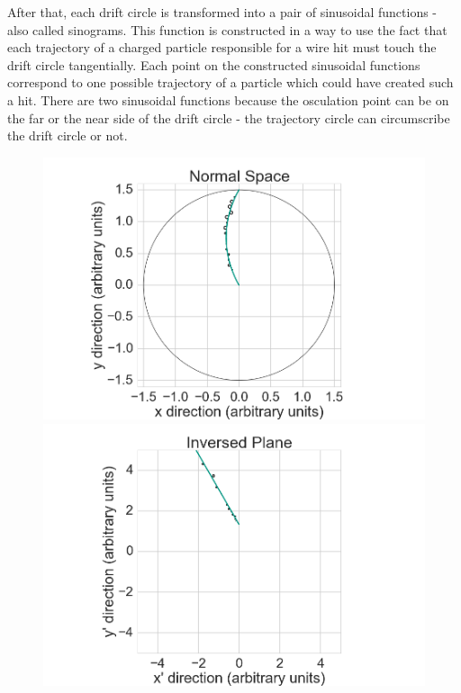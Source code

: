 After that, each drift circle is transformed into a pair of sinusoidal functions - also called sinograms. This function is constructed in a way to use the fact that each trajectory of a charged particle responsible for a wire hit must touch the drift circle tangentially. Each point on the constructed sinusoidal functions correspond to one possible trajectory of a particle which could have created such a hit. There are two sinusoidal functions because the osculation point can be on the far or the near side of the drift circle - the trajectory circle can circumscribe the drift circle or not.

\begin{figure}
 \centering
 \includegraphics[scale=0.15]{figures/theory/legendre_1.png}
 \includegraphics[scale=0.15]{figures/theory/legendre_2.png}

\end{figure}
